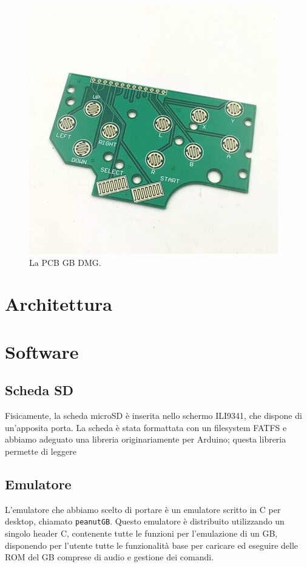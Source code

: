 \documentclass[hidelinks,12pt]{article}
\begin{document}
\begin{figure}[h]
	\begin{center}
		\includegraphics[scale=0.4]{figures/pcb.jpeg}
	\end{center}
	\caption{La PCB GB DMG.}
	\label{fig:pcb}
\end{figure}


\section{Architettura}

\section{Software}
\subsection{Scheda SD}
Fisicamente, la scheda microSD è inserita nello schermo ILI9341, che dispone di
un'apposita porta. La scheda è stata formattata con un filesystem FATFS e
abbiamo adeguato una libreria originariamente per Arduino; questa libreria
permette di leggere

\subsection{Emulatore}
L'emulatore che abbiamo scelto di portare è un emulatore scritto in C per
desktop, chiamato \texttt{peanutGB}. Questo emulatore è distribuito utilizzando
un singolo header C, contenente tutte le funzioni per l'emulazione di un GB,
disponendo per l'utente tutte le funzionalità base per caricare ed eseguire
delle ROM del GB comprese di audio e gestione dei comandi.
\end{document}
